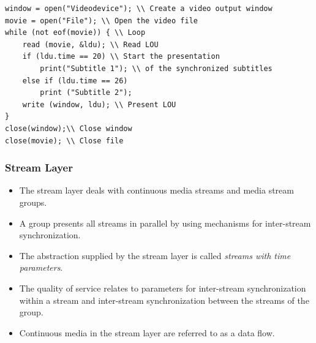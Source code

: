 \begin{lstlisting}[frame=single]
window = open("Videodevice"); \\ Create a video output window
movie = open("File"); \\ Open the video file
while (not eof(movie)) { \\ Loop
	read (movie, &ldu); \\ Read LOU
	if (ldu.time == 20) \\ Start the presentation
		print("Subtitle 1"); \\ of the synchronized subtitles
	else if (ldu.time == 26)
		print ("Subtitle 2");
	write (window, ldu); \\ Present LOU
}
close(window);\\ Close window
close(movie); \\ Close file
\end{lstlisting}

\subsubsection{Stream Layer}
\begin{multicols}{2}
	\begin{itemize}
		\item The stream layer deals with continuous media streams and media stream groups. 
		\item A	group presents all streams in parallel by using mechanisms for inter-stream synchronization. 
		\item The abstraction supplied by the stream layer is called \textit{streams with time parameters}. 
		\item The quality of service relates to parameters for inter-stream synchronization	within a stream and inter-stream synchronization between the streams of the group.
		\item Continuous media in the stream layer are referred to as a data flow.
	\end{itemize}
\end{multicols}



